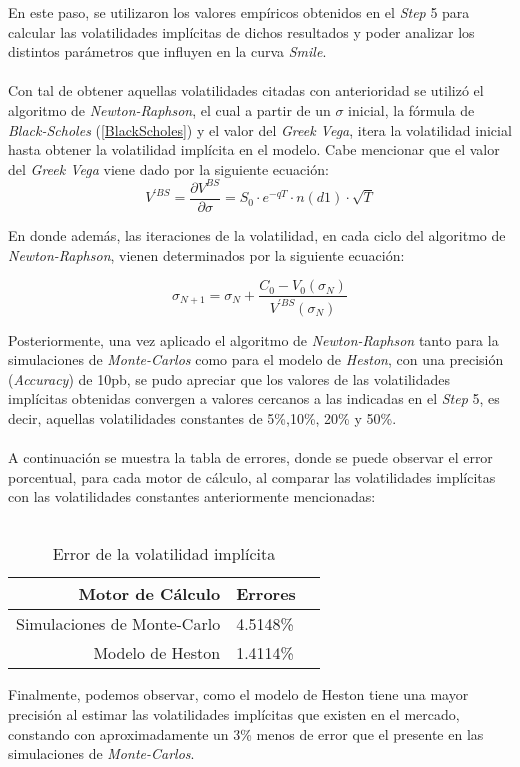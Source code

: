 \noindent En este paso, se utilizaron los valores empíricos obtenidos en el \textit{Step} 5 para calcular las volatilidades implícitas de dichos resultados y poder analizar los distintos parámetros que influyen en la curva \textit{Smile}.\\\\
\noindent Con tal de obtener aquellas volatilidades citadas con anterioridad se utilizó el algoritmo de \textit{Newton-Raphson}, el cual a partir de un $\sigma$ inicial, la fórmula de \textit{Black-Scholes} (\ref{BlackScholes}) y el valor del \textit{Greek Vega}, itera la volatilidad inicial hasta obtener la volatilidad implícita en el modelo. Cabe mencionar que el valor del \textit{Greek Vega} viene dado por la siguiente ecuación:
\begin{equation}
       V^{'BS}=\frac{\partial V^{BS}}{\partial \sigma} = S_0 \cdot e^{-qT} \cdot n(d1) \cdot \sqrt{T}
       \label{vega}
\end{equation}

\noindent En donde además, las iteraciones de la volatilidad, en cada ciclo del algoritmo de \textit{Newton-Raphson}, vienen determinados por la siguiente ecuación:

\begin{equation}
    \sigma_{N+1}=\sigma_N + \frac{C_0-V_0(\sigma_N)}{V^{'BS}(\sigma_N)}
\end{equation}

\noindent Posteriormente, una vez aplicado el algoritmo de \textit{Newton-Raphson} tanto para la simulaciones de \textit{Monte-Carlos} como para el modelo de \textit{Heston}, con una precisión (\textit{Accuracy})  de 10pb, se pudo apreciar que los valores de las volatilidades implícitas obtenidas convergen a valores cercanos a las indicadas en el \textit{Step} 5, es decir, aquellas volatilidades  constantes de 5\%,10\%, 20\% y 50\%.\\\\
\noindent A continuación se muestra la tabla de errores, donde se puede observar el error porcentual, para cada motor de cálculo, al comparar las volatilidades implícitas con las volatilidades constantes anteriormente mencionadas:\\\\

\begin{table}[h]
\begin{center}
\begin{tabular}{| r | l | c |}

\hline   
Motor de Cálculo & Errores \\ \hline
Simulaciones de Monte-Carlo &  4.5148\% \\
Modelo de Heston &  1.4114\% \\ \hline
\end{tabular}
\caption{Error de la volatilidad implícita}
\label{tab:volimplicita}
\end{center}
\end{table}

\noindent Finalmente, podemos observar, como el modelo de Heston tiene una mayor precisión al estimar las volatilidades implícitas que existen en el mercado, constando con aproximadamente un 3\% menos de error que el presente en las simulaciones de \textit{Monte-Carlos}.

\newpage